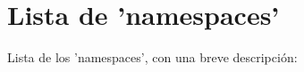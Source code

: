 \section{Lista de 'namespaces'}
Lista de los 'namespaces', con una breve descripción\-:\begin{DoxyCompactList}
\item{}
\end{DoxyCompactList}
